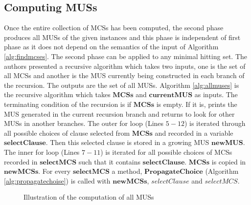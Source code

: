 \subsection{Computing MUSs}
Once the entire collection of MCSs has been computed, the second phase produces all MUSs of the given instances and this phase is independent of first phase as it does not depend on the semantics of the input of Algorithm \ref{alg:findmcses}. The second phase can be applied to any minimal hitting set. The authors presented a recursive algorithm which takes two inputs, one is the set of all MCSs and another is the MUS currently being constructed in each branch of the recursion. The outputs are the set of all MUSs.\newline
Algorithm \ref{alg:allmuses} is the recursive algorithm which takes $\mathbf{MCSs}$ and $\mathbf{currentMUS}$ as inputs. The terminating condition of the recursion is if $\mathbf{MCSs}$ is empty. If it is, prints the MUS generated in the current recursion branch and returns to look for other MUSs in another branches. The outer for loop (Lines $5-12$) is iterated through all possible choices of clause selected from $\mathbf{MCSs}$ and recorded in a variable $\mathbf{selectClause}$. Then this selected clause is stored in a growing MUS $\mathbf{newMUS}$. The inner for loop (Lines $7-11$) is iterated for all possible choices of MCSs recorded in $\mathbf{selectMCS}$ such that it contains $\mathbf{selectClause}$. $\mathbf{MCSs}$ is copied in $\mathbf{newMCSs}$.\newline
For every $\mathbf{selectMCS}$ a method, $\mathbf{PropagateChoice}$ (Algorithm \ref{alg:propagatechoise}) is called with $\mathbf{newMCSs}$, $\mathbf{\textit{selectClause}}$ and $\mathbf{\textit{selectMCS}}$.

\begin{figure}[htb] %
	\begin{center}
		
	\end{center}
	\caption{Illustration of the computation of all MUSs}
	\label{fig:graphallmuses}
\end{figure}

